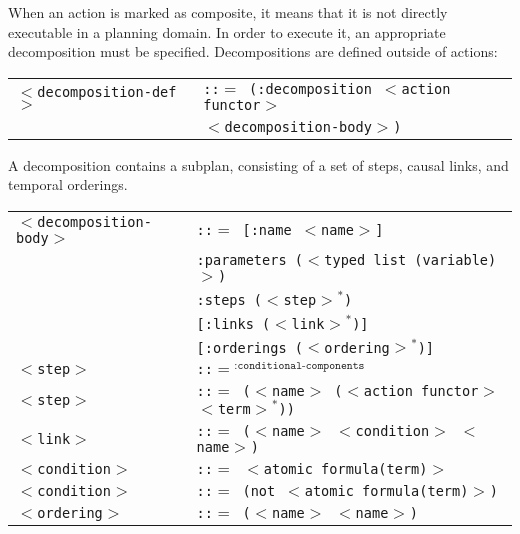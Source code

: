 \documentclass[10pt]{article}
\begin{document}
\begin{flushleft}
When an action is marked as composite, it means that it is not directly executable in a planning domain. In order to execute it, an appropriate decomposition must be specified. Decompositions are defined outside of actions:

\begin{tabbing}
\begin{tabular}{l l}
\texttt{$<$decomposition-def$>$} & \texttt{::$=$ (:decomposition $<$action functor$>$} \\
  & \hspace{7 mm} \texttt{$<$decomposition-body$>$)} \\
  
\end{tabular}
\end{tabbing}


A decomposition contains a subplan, consisting of a set of steps, causal links, and temporal orderings.

\begin{tabbing}
\begin{tabular}{l l}
\texttt{$<$decomposition-body$>$} & \texttt{::$=$ [:name $<$name$>$]} \\
  & \hspace{7 mm} \texttt{:parameters ($<$typed list (variable)$>$)} \\
  & \hspace{7 mm} \texttt{:steps ($<$step$>$$^*$)} \\
  & \hspace{7 mm} \texttt{[:links ($<$link$>$$^*$)]} \\
  & \hspace{7 mm} \texttt{[:orderings ($<$ordering$>$$^*$)]} \\
\texttt{$<$step$>$} & \texttt{::$=$$^{ \texttt{:conditional-components}}$}\\
\texttt{$<$step$>$} & \texttt{::$=$ ($<$name$>$ ($<$action functor$>$ $<$term$>$$^*$))}\\
\texttt{$<$link$>$} & \texttt{::$=$ ($<$name$>$ $<$condition$>$ $<$name$>$)}\\
\texttt{$<$condition$>$} & \texttt{::$=$ $<$atomic formula(term)$>$}\\
\texttt{$<$condition$>$} & \texttt{::$=$ (not $<$atomic formula(term)$>$)}\\
\texttt{$<$ordering$>$} & \texttt{::$=$ ($<$name$>$ $<$name$>$)} \\
\end{tabular}
\end{tabbing}

\end{flushleft}




\end{document}
